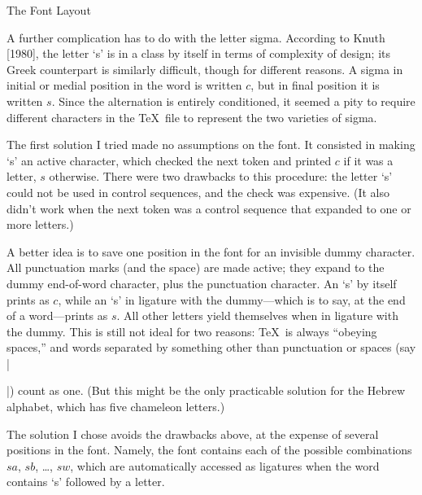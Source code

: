 \heading The Font Layout \endheading

A further complication has to do with the letter sigma.  According to
Knuth [1980], the letter `s' is in a class by itself in terms of
complexity of design; its Greek counterpart is similarly difficult, though
for different reasons.  A sigma in initial or medial position in the word
is written $c$, but in final position it is written $s$.  Since the
alternation is entirely conditioned, it seemed a pity to require different
characters in the \TeX\ file to represent the two varieties of sigma.

The first solution I tried made no assumptions on the font.  It
consisted in making `s' an active character, which checked the next
token and printed $c$ if it was a letter, $s$ otherwise.  There were
two drawbacks to this procedure: the letter `s' could not be used
in control sequences, and the check was expensive.  (It also didn't
work when the next token was a control sequence that expanded to one
or more letters.)

A better idea is to save one position in the font for an
invisible dummy character.  All punctuation marks (and the space)
are made active; they expand to the dummy end-of-word character,
plus the punctuation character.  An `s' by itself prints as $c$,
while an `s' in ligature with the dummy---which is to say, at the end
of a word---prints as $s$.  All other letters yield themselves when
in ligature with the dummy.  This is still not ideal for two reasons:
\TeX\ is always ``obeying spaces,'' and words separated by something
other than punctuation or spaces (say |\par|) count as one.  (But
this might be the only practicable solution for the Hebrew alphabet,
which has five chameleon letters.)

The solution I chose avoids the drawbacks above, at the expense of
several positions in the font.  Namely, the font contains each of
the possible combinations $sa$, $sb$, \dots, $sw$, which are
automatically accessed as ligatures when the word contains `s'
followed by a letter.

